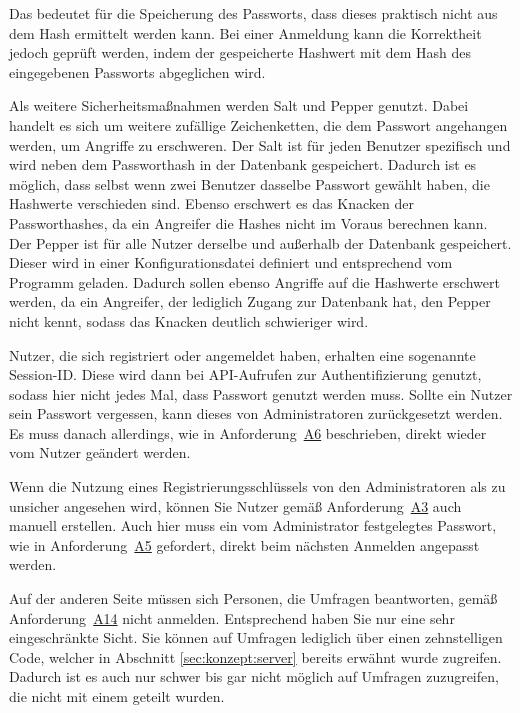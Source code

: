 Das bedeutet für die Speicherung des Passworts, dass dieses praktisch nicht aus dem Hash ermittelt werden kann.
Bei einer Anmeldung kann die Korrektheit jedoch geprüft werden, indem der gespeicherte Hashwert mit dem Hash des eingegebenen Passworts abgeglichen wird.

Als weitere Sicherheitsmaßnahmen werden Salt und Pepper genutzt.
Dabei handelt es sich um weitere zufällige Zeichenketten, die dem Passwort angehangen werden, um Angriffe zu erschweren.
Der Salt ist für jeden Benutzer spezifisch und wird neben dem Passworthash in der Datenbank gespeichert.
Dadurch ist es möglich, dass selbst wenn zwei Benutzer dasselbe Passwort gewählt haben, die Hashwerte verschieden sind.
Ebenso erschwert es das Knacken der Passworthashes, da ein Angreifer die Hashes nicht im Voraus berechnen kann.
Der Pepper ist für alle Nutzer derselbe und außerhalb der Datenbank gespeichert.
Dieser wird in einer Konfigurationsdatei definiert und entsprechend vom Programm geladen.
Dadurch sollen ebenso Angriffe auf die Hashwerte erschwert werden, da ein Angreifer, der lediglich Zugang zur Datenbank hat, den Pepper nicht kennt, sodass das Knacken deutlich schwieriger wird.

Nutzer, die sich registriert oder angemeldet haben, erhalten eine sogenannte Session-ID.
Diese wird dann bei \acs{API}-Aufrufen zur Authentifizierung genutzt, sodass hier nicht jedes Mal, dass Passwort genutzt werden muss.
Sollte ein Nutzer sein Passwort vergessen, kann dieses von Administratoren zurückgesetzt werden.
Es muss danach allerdings, wie in Anforderung~\hyperref[Anf:A6]{A6} beschrieben, direkt wieder vom Nutzer geändert werden.

Wenn die Nutzung eines Registrierungsschlüssels von den Administratoren als zu unsicher angesehen wird, können Sie Nutzer gemäß Anforderung~\hyperref[Anf:A3]{A3} auch manuell erstellen.
Auch hier muss ein vom Administrator festgelegtes Passwort, wie in Anforderung~\hyperref[Anf:A5]{A5} gefordert, direkt beim nächsten Anmelden angepasst werden.

Auf der anderen Seite müssen sich Personen, die Umfragen beantworten, gemäß Anforderung~\hyperref[Anf:A14]{A14} nicht anmelden.
Entsprechend haben Sie nur eine sehr eingeschränkte Sicht.
Sie können auf Umfragen lediglich über einen zehnstelligen Code, welcher in Abschnitt \ref{sec:konzept:server} bereits erwähnt wurde zugreifen.
Dadurch ist es auch nur schwer bis gar nicht möglich auf Umfragen zuzugreifen, die nicht mit einem geteilt wurden.
